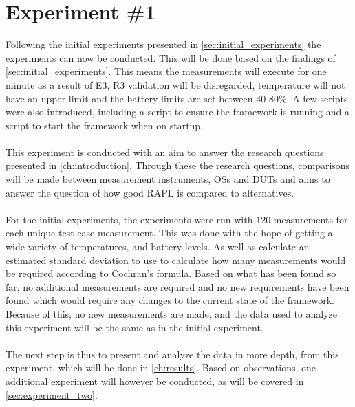 \section{Experiment \#1}\label{sec:experiment_one}

Following the initial experiments presented in \cref{sec:initial_experiments} the experiments can now be conducted. This will be done based on the findings of \cref{sec:initial_experiments}. This means the measurements will execute for one minute as a result of E3, R3 validation will be disregarded, temperature will not have an upper limit and the battery limits are set between 40-80\%. A few scripts were also introduced, including a script to ensure the framework is running and a script to start the framework when on startup.

\paragraph*{}
This experiment is conducted with an aim to answer the research questions presented in \cref{ch:introduction}. Through these the research questions, comparisons will be made between measurement instruments, OSs and DUTs and aims to answer the question of how good RAPL is compared to alternatives.

\paragraph*{}
For the initial experiments, the experiments were run with $120$ measurements for each unique test case measurement. This was done with the hope of getting a wide variety of temperatures, and battery levels. As well as calculate an estimated standard deviation to use to calculate how many measurements would be required according to Cochran's formula. Based on what has been found so far, no additional measurements are required and no new requirements have been found which would require any changes to the current state of the framework. Because of this, no new measurements are made, and the data used to analyze this experiment will be the same as in the initial experiment.

\paragraph*{}
The next step is thus to present and analyze the data in more depth, from this experiment, which will be done in \cref{ch:results}. Based on observations, one additional experiment will however be conducted, as will be covered in \cref{sec:experiment_two}.